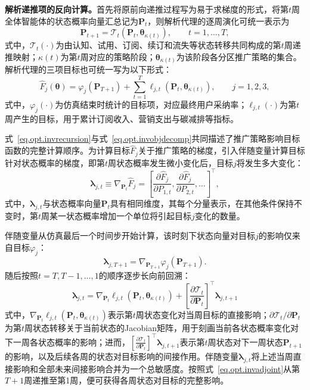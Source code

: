 \textbf{解析递推项的反向计算。}首先将原前向递推过程写为易于求梯度的形式，将第$t$周全体智能体的状态概率向量汇总记为$\bm{P}_{t}$，则解析代理的逐周演化可统一表示为
\begin{equation}
\bm{P}_{t+1}
=\mathcal{T}_{t}\left(\bm{P}_{t},\bm{\theta}_{\kappa(t)}\right),
\qquad t=1,\ldots,T,
\label{eq.opt.invrecursion}
\end{equation}
式中，$\mathcal{T}_{t}(\cdot)$为由认知、试用、订阅、续订和流失等状态转移共同构成的第$t$周递推映射；$\kappa(t)$为第$t$周对应的策略阶段；$\bm{\theta}_{\kappa(t)}$为该阶段各分区推广策略的集合。解析代理的三项目标也可统一写为以下形式：
\begin{equation}
\hat{F}_{j}\left(\bm{\theta}\right)
=
\varphi_{j}\left(\bm{P}_{T+1}\right)
+\sum_{t=1}^{T}
\ell_{j,t}\left(\bm{P}_{t},\bm{\theta}_{\kappa(t)}\right),
\qquad j=1,2,3,
\label{eq.opt.invobjdecomp}
\end{equation}
式中，$\varphi_{j}(\cdot)$为仿真结束时统计的目标项，对应最终用户采纳率；$\ell_{j,t}(\cdot)$为第$t$周产生的目标，用于累计订阅收入、营销支出与碳减排等指标。

式~\eqref{eq.opt.invrecursion}与式~\eqref{eq.opt.invobjdecomp}共同描述了推广策略影响目标函数的完整计算顺序。为计算目标$\hat{F}_{j}$关于推广策略的梯度，引入伴随变量计算目标针对状态概率的梯度，即第$t$周状态概率发生微小变化后，目标$j$将发生多大变化：
\begin{equation}
\bm{\lambda}_{j,t}
\equiv
\nabla_{\bm{P}_{t}}\hat{F}_{j}
=
\left[
\frac{\partial\hat{F}_{j}}{\partial P_{1,t}},
\frac{\partial\hat{F}_{j}}{\partial P_{2,t}},
\ldots
\right]^{\top},
\label{eq.opt.invadjointdef}
\end{equation}
式中，$\bm{\lambda}_{j,t}$与状态概率向量$\bm{P}_{t}$具有相同维度，其每个分量表示，在其他条件保持不变时，第$t$周某一状态概率增加一个单位将引起目标$j$变化的数量。

伴随变量从仿真最后一个时间步开始计算，该时刻下状态向量对目标$j$的影响仅来自目标$\varphi_{j}$：
\begin{equation}
\bm{\lambda}_{j,T+1}
=
\nabla_{\bm{P}_{T+1}}
\varphi_{j}\left(\bm{P}_{T+1}\right).
\label{eq.opt.invadjointterminal}
\end{equation}
随后按照$t=T,T-1,\ldots,1$的顺序逐步长向前回溯：
\begin{equation}
\bm{\lambda}_{j,t}
=
\nabla_{\bm{P}_{t}}
\ell_{j,t}\left(
\bm{P}_{t},
\bm{\theta}_{\kappa(t)}
\right)
+
\left[
\frac{\partial \mathcal{T}_{t}}
{\partial \bm{P}_{t}}
\right]^{\top}
\bm{\lambda}_{j,t+1}
\label{eq.opt.invadjoint}
\end{equation}
式中，$\nabla_{\bm{P}_{t}}\ell_{j,t}\left(\bm{P}_{t},\bm{\theta}_{\kappa(t)}\right)$表示第$t$周状态变化对当周目标的直接影响；$\partial\mathcal{T}_{t}/\partial\bm{P}_{t}$为第$t$周状态转移关于当前状态的Jacobian矩阵，用于刻画当前各状态概率变化对下一周各状态概率的影响；进而，$\left[\frac{\partial\mathcal{T}_{t}}{\partial\bm{P}_{t}}\right]^{\top}\bm{\lambda}_{j,t+1}$表示第$t$周状态对下一周状态$\bm{P}_{t+1}$的影响，以及后续各周的状态对目标影响的间接作用。伴随变量$\bm{\lambda}_{j,t}$将上述当周直接影响和全部未来间接影响合并为一个总敏感度。按照式~\eqref{eq.opt.invadjoint}从第$T+1$周递推至第1周，便可获得各周状态对目标的完整影响。

